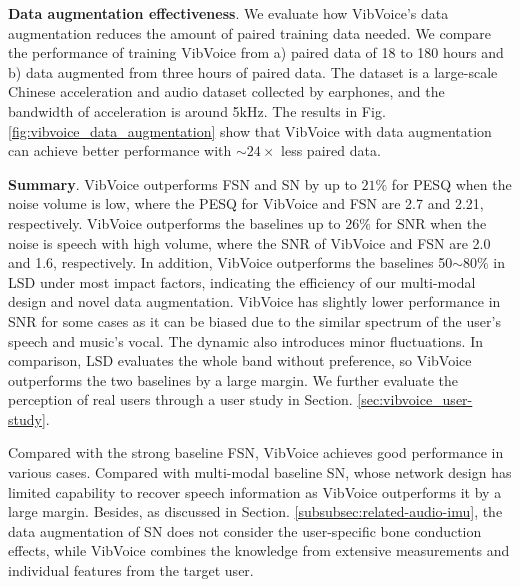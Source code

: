 \noindent\textbf{Data augmentation effectiveness}.
We evaluate how VibVoice's data augmentation reduces the amount of paired training data needed. We compare the performance of training VibVoice from a) paired data of 18 to 180 hours and b) data augmented from three hours of paired data. The dataset \citep{wang2022fusing} is a large-scale Chinese acceleration and audio dataset collected by earphones, and the bandwidth of acceleration is around 5kHz. The results in Fig. \ref{fig:vibvoice_data_augmentation} show that VibVoice with data augmentation can achieve better performance with $\sim24\times$ less paired data.

\noindent\textbf{Summary}.
VibVoice outperforms FSN and SN by up to $21\%$ for PESQ when the noise volume is low, where the PESQ for VibVoice and FSN are 2.7 and 2.21, respectively. VibVoice outperforms the baselines up to $26\%$ for SNR when the noise is speech with high volume, where the SNR of VibVoice and FSN are 2.0 and 1.6, respectively. In addition, VibVoice outperforms the baselines 50$\sim$80$\%$ in LSD under most impact factors, indicating the efficiency of our multi-modal design and novel data augmentation. VibVoice has slightly lower performance in SNR for some cases as it can be biased due to the similar spectrum of the user's speech and music's vocal. The dynamic also introduces minor fluctuations. In comparison, LSD evaluates the whole band without preference, so VibVoice outperforms the two baselines by a large margin.
We further evaluate the perception of real users through a user study in Section. \ref{sec:vibvoice_user-study}.


Compared with the strong baseline FSN, VibVoice achieves good performance in various cases. 
Compared with multi-modal baseline SN, whose network design has limited capability to recover speech information as VibVoice outperforms it by a large margin. Besides, as discussed in Section. \ref{subsubsec:related-audio-imu}, the data augmentation of SN does not consider the user-specific bone conduction effects, while VibVoice combines the knowledge from extensive measurements and individual features from the target user.


